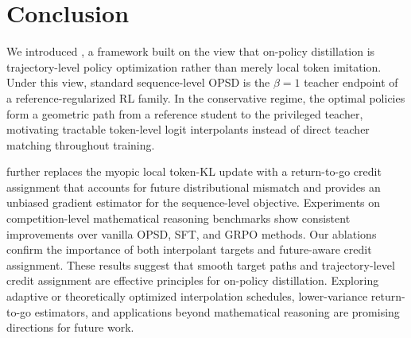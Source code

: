 \section{Conclusion}
\label{sec:conclusion}
We introduced \ours{}, a framework built on the view that on-policy distillation is
trajectory-level policy optimization rather than merely local token imitation. Under this
view, standard sequence-level OPSD is the $\beta=1$ teacher endpoint of a
reference-regularized RL family. In the conservative regime, the optimal policies form a
geometric path from a reference student to the privileged teacher, motivating tractable
token-level logit interpolants instead of direct teacher matching throughout training.

\ours{} further replaces the myopic local token-KL update with a return-to-go credit assignment that
accounts for future distributional mismatch and provides an unbiased gradient estimator for
the sequence-level objective. Experiments on competition-level mathematical reasoning
benchmarks show consistent improvements over vanilla OPSD, SFT, and GRPO methods. Our
ablations confirm the importance of both interpolant targets and future-aware credit
assignment. These results suggest that smooth target paths and trajectory-level credit
assignment are effective principles for on-policy distillation. Exploring adaptive or
theoretically optimized interpolation schedules, lower-variance return-to-go estimators, and
applications beyond mathematical reasoning are promising directions for future work.